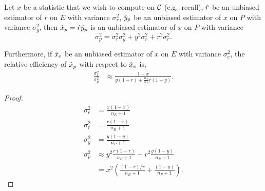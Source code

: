 \begin{theorem} 
  \label{thm:variance-pooled-recall}
  Let $x$ be a statistic that we wish to compute on $\mathcal{C}$ (e.g.\ recall),
    $\hat{r}$ be an unbiased estimator of $r$ on $E$ with variance $\sigma_r^2$,
    $\hat{y}_p$ be an unbiased estimator of $x$ on $P$ with variance $\sigma_y^2$,
  then $\hat{x}_p = \hat{r} \hat{y}_p$ is an unbiased estimator of $x$ on $P$ with variance
  $$
  \sigma_p^2 = \sigma_r^2 \sigma_y^2 + y^2 \sigma_r^2 + r^2 \sigma_r^2.
  $$

  Furthermore, if $\hat{x}_e$ be an unbiased estimator of $x$ on $E$ with variance $\sigma_e^2$,
  the relative efficiency of $\hat{x}_p$ with respect to $\hat{x}_e$ is,
  \begin{align*}
  \frac{\sigma_e^2}{\sigma_p^2}
  &\approx \frac{1-x}
      {
      y (1-r) + \frac{n_E}{n_P} r (1-y)
      }.
  \end{align*}
\end{theorem}
\begin{proof}
  \begin{align*}
    \sigma_e^2 &= \frac{x (1-x)}{n_E + 1} \\
    \sigma_r^2 &= \frac{r (1-r)}{n_E + 1} \\
    \sigma_y^2 &= \frac{y (1-y)}{n_P + 1} \\
    \sigma_p^2 
    &\approx y^2 \frac{r (1-r)}{n_E + 1} + r^2 \frac{y (1-y)}{n_P + 1} \\
    &= x^2 \left( \frac{(1-r)/r}{n_E + 1} + \frac{(1-y)}{n_P + 1} \right).
  \end{align*}
\end{proof}

